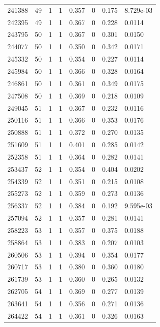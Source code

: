 \documentclass[preview]{standalone}
\begin{document}
{{{{{{{{{{{{{{{{{{\begin{tabular}{L{1.2cm}C{1.2cm} C{0.3cm}C{0.5cm} C{1.4cm}C{1.4cm} C{1.4cm}C{1.4cm}}
  241388  &    49  & 1     &  1 &  0.357  & 0  & 0.175 &  8.729e-03   \\ 
  242395  &    49  & 1     &  1 &  0.367  & 0  & 0.228 &  0.0114   \\ 
  243795  &    50  & 1     &  1 &  0.367  & 0  & 0.301 &  0.0150   \\ 
  244077  &    50  & 1     &  1 &  0.350  & 0  & 0.342 &  0.0171   \\ 
  245332  &    50  & 1     &  1 &  0.354  & 0  & 0.227 &  0.0114   \\ 
  245984  &    50  & 1     &  1 &  0.366  & 0  & 0.328 &  0.0164   \\ 
  246861  &    50  & 1     &  1 &  0.361  & 0  & 0.349 &  0.0175   \\ 
  247508  &    50  & 1     &  1 &  0.369  & 0  & 0.218 &  0.0109   \\ 
  249045  &    51  & 1     &  1 &  0.367  & 0  & 0.232 &  0.0116   \\ 
  250116  &    51  & 1     &  1 &  0.366  & 0  & 0.353 &  0.0176   \\ 
  250888  &    51  & 1     &  1 &  0.372  & 0  & 0.270 &  0.0135   \\ 
  251609  &    51  & 1     &  1 &  0.401  & 0  & 0.285 &  0.0142   \\ 
  252358  &    51  & 1     &  1 &  0.364  & 0  & 0.282 &  0.0141   \\ 
  253437  &    52  & 1     &  1 &  0.354  & 0  & 0.404 &  0.0202   \\ 
  254339  &    52  & 1     &  1 &  0.351  & 0  & 0.215 &  0.0108   \\ 
  255273  &    52  & 1     &  1 &  0.359  & 0  & 0.273 &  0.0136   \\ 
  256337  &    52  & 1     &  1 &  0.384  & 0  & 0.192 &  9.595e-03   \\ 
  257094  &    52  & 1     &  1 &  0.357  & 0  & 0.281 &  0.0141   \\ 
  258223  &    53  & 1     &  1 &  0.357  & 0  & 0.375 &  0.0188   \\ 
  258864  &    53  & 1     &  1 &  0.383  & 0  & 0.207 &  0.0103   \\ 
  260506  &    53  & 1     &  1 &  0.394  & 0  & 0.354 &  0.0177   \\ 
  260717  &    53  & 1     &  1 &  0.380  & 0  & 0.360 &  0.0180   \\ 
  261739  &    53  & 1     &  1 &  0.360  & 0  & 0.265 &  0.0132   \\ 
  262705  &    54  & 1     &  1 &  0.369  & 0  & 0.277 &  0.0139   \\ 
  263641  &    54  & 1     &  1 &  0.356  & 0  & 0.271 &  0.0136   \\ 
  264422  &    54  & 1     &  1 &  0.361  & 0  & 0.326 &  0.0163   \\ 
\hline 
\end{tabular} 

}}}}}}}}}}}}}}}}}}
\end{document}
